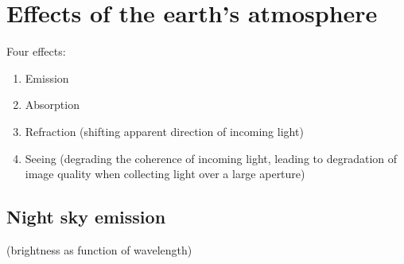 \documentclass[12pt]{article}
\begin{document}
\newpage
\section{Effects of the earth's atmosphere}

Four effects:
\begin{enumerate}
    \item Emission
    \item Absorption
    \item Refraction (shifting apparent direction of incoming light)
    \item Seeing (degrading the coherence of incoming light,
        leading to degradation of image quality when collecting light
        over a large aperture)
\end{enumerate}

\subsection{Night sky emission}
(brightness as function of wavelength)
\end{document}
